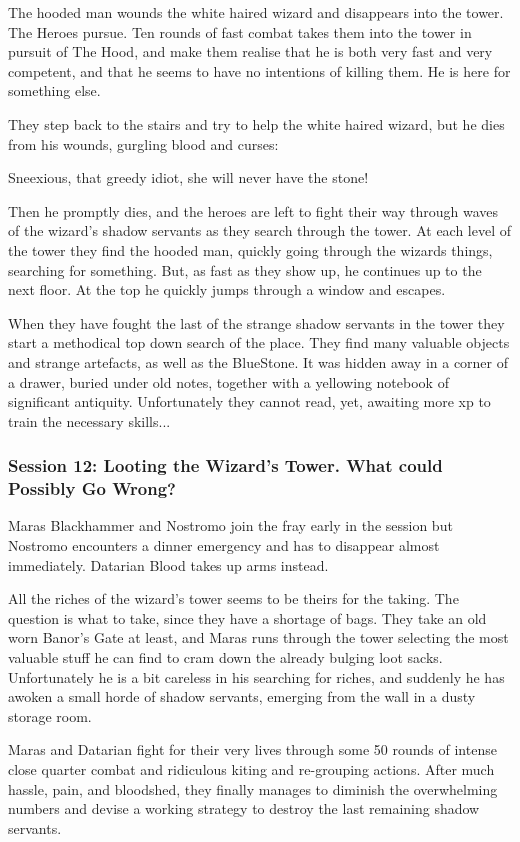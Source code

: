The hooded man wounds the white haired wizard and disappears into the tower. The Heroes pursue. Ten rounds of fast combat takes them into the tower in pursuit of The Hood, and make them realise that he is both very fast and very competent, and that he seems to have no intentions of killing them. He is here for something else.

They step back to the stairs and try to help the white haired wizard, but he dies from his wounds, gurgling blood and curses:
\begin{readoutloud}
Sneexious, that greedy idiot, she will never have the stone!
\end{readoutloud}
Then he promptly dies, and the heroes are left to fight their way through waves of the wizard's shadow servants as they search through the tower. At each level of the tower they find the hooded man, quickly going through the wizards things, searching for something. But, as fast as they show up, he continues up to the next floor. At the top he quickly jumps through a window and escapes.

When they have fought the last of the strange shadow servants in the tower they start a methodical top down search of the place. They find many valuable objects and strange artefacts, as well as the BlueStone. It was hidden away in a corner of a drawer, buried under old notes, together with a yellowing notebook of significant antiquity. Unfortunately they cannot read, yet, awaiting more xp to train the necessary skills...


\subsubsection*{Session 12: Looting the Wizard's Tower. What could Possibly Go Wrong?}
Maras Blackhammer and Nostromo join the fray early in the session but Nostromo encounters a dinner emergency and has to disappear almost immediately. Datarian Blood takes up arms instead.

All the riches of the wizard's tower seems to be theirs for the taking. The question is what to take, since they have a shortage of bags. They take an old worn Banor's Gate at least, and Maras runs through the tower selecting the most valuable stuff he can find to cram down the already bulging loot sacks. Unfortunately he is a bit careless in his searching for riches, and suddenly he has awoken a small horde of shadow servants, emerging from the wall in a dusty storage room.

Maras and Datarian fight for their very lives through some 50 rounds of intense close quarter combat and ridiculous kiting and re-grouping actions. After much hassle, pain, and bloodshed, they finally manages to diminish the overwhelming numbers and devise a working strategy to destroy the last remaining shadow servants.

